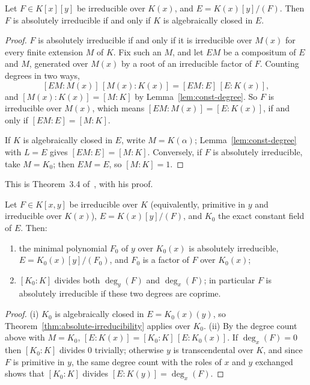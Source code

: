 \begin{theorem}\label{thm:absolute-irreducibility}
Let $F \in K[x][y]$ be irreducible over $K(x)$, and $E = K(x)[y]/(F)$. Then
$F$ is absolutely irreducible if and only if $K$ is algebraically closed in
$E$.
\end{theorem}

\begin{proof}
$F$ is absolutely irreducible if and only if it is irreducible over $M(x)$
for every finite extension $M$ of $K$. Fix such an $M$, and let $E M$ be a
compositum of $E$ and $M$, generated over $M(x)$ by a root of an irreducible
factor of $F$. Counting degrees in two ways,
\[
  [E M : M(x)]\, [M(x) : K(x)] = [E M : E]\, [E : K(x)] ,
\]
and $[M(x) : K(x)] = [M : K]$ by Lemma~\ref{lem:const-degree}. So $F$ is
irreducible over $M(x)$, which means $[EM : M(x)] = [E : K(x)]$, if and only
if $[EM : E] = [M : K]$.

If $K$ is algebraically closed in $E$, write $M = K(\alpha)$;
Lemma~\ref{lem:const-degree} with $L = E$ gives $[EM : E] = [M : K]$.
Conversely, if $F$ is absolutely irreducible, take $M = K_0$; then $EM = E$,
so $[M : K] = 1$.
\end{proof}

This is Theorem~3.4 of~\cite{trager1984}, with his proof.

\begin{corollary}\label{cor:exact-field}
Let $F \in K[x, y]$ be irreducible over $K$ (equivalently, primitive in $y$
and irreducible over $K(x)$), $E = K(x)[y]/(F)$, and $K_0$ the exact constant
field of $E$. Then:
\begin{enumerate}[label=\textup{(\roman*)}]
\item the minimal polynomial $F_0$ of $y$ over $K_0(x)$ is absolutely
  irreducible, $E = K_0(x)[y]/(F_0)$, and $F_0$ is a factor of $F$ over
  $K_0(x)$;
\item $[K_0 : K]$ divides both $\deg_y(F)$ and $\deg_x(F)$; in particular $F$
  is absolutely irreducible if these two degrees are coprime.
\end{enumerate}
\end{corollary}

\begin{proof}
(i) $K_0$ is algebraically closed in $E = K_0(x)(y)$, so
Theorem~\ref{thm:absolute-irreducibility} applies over $K_0$. (ii) By the
degree count above with $M = K_0$, $[E : K(x)] = [K_0 : K]\, [E : K_0(x)]$.
If $\deg_x(F) = 0$ then $[K_0 : K]$ divides $0$ trivially; otherwise $y$ is
transcendental over $K$, and since $F$ is primitive in $y$, the same degree
count with the roles of $x$ and $y$ exchanged shows that $[K_0 : K]$ divides
$[E : K(y)] = \deg_x(F)$.
\end{proof}

